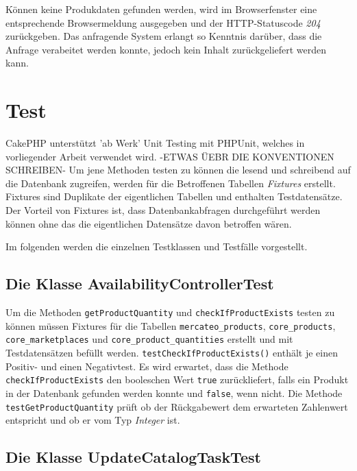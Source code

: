 	Können keine Produkdaten gefunden werden, wird im Browserfenster eine entsprechende Browsermeldung ausgegeben und der HTTP-Statuscode \textit{204} zurückgeben. Das anfragende System erlangt so Kenntnis darüber, dass die Anfrage verabeitet werden konnte, jedoch kein Inhalt zurückgeliefert werden kann.
	
	
	
	

	
	\section{Test}
	
	
	CakePHP unterstützt 'ab Werk' Unit Testing mit PHPUnit, welches in vorliegender Arbeit verwendet wird. -ETWAS ÜEBR DIE KONVENTIONEN SCHREIBEN-  Um jene Methoden testen zu können die lesend und schreibend auf die Datenbank zugreifen, werden für die Betroffenen Tabellen \textit{Fixtures} erstellt. Fixtures sind Duplikate der eigentlichen Tabellen und enthalten Testdatensätze. Der Vorteil von Fixtures ist, dass Datenbankabfragen durchgeführt werden können ohne das die eigentlichen Datensätze davon betroffen wären.
	
	Im folgenden werden die einzelnen Testklassen und Testfälle vorgestellt.
	
	\subsection{Die Klasse AvailabilityControllerTest}
	
	Um die Methoden \texttt{getProductQuantity} und \texttt{checkIfProductExists} testen zu können müssen Fixtures für die Tabellen \texttt{mercateo\_products}, \texttt{core\_products}, \texttt{core\_marketplaces} und \texttt{core\_product\_quantities} erstellt und mit Testdatensätzen befüllt werden.
	\texttt{testCheckIfProductExists()} enthält je einen Positiv- und einen Negativtest. Es wird erwartet, dass die Methode \texttt{checkIfProductExists} den booleschen Wert \texttt{true} zurückliefert, falls ein Produkt in der Datenbank gefunden werden konnte und \texttt{false}, wenn nicht.
	Die Methode \texttt{testGetProductQuantity} prüft ob der Rückgabewert dem erwarteten Zahlenwert entspricht und ob er vom Typ \textit{Integer} ist.
	
	\subsection{Die Klasse UpdateCatalogTaskTest}
	
